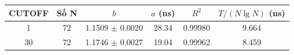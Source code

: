 \begin{tabular}{cccccc}
\toprule
CUTOFF & Số N & $b$ & $a$ (ns) & $R^2$ & $T/(N\lg N)$ (ns) \\
\midrule
1 & 72 & 1.1509 $\pm$ 0.0020 & 28.34 & 0.99980 & 9.664 \\
30 & 72 & 1.1746 $\pm$ 0.0027 & 19.04 & 0.99962 & 8.459 \\
\bottomrule
\end{tabular}
